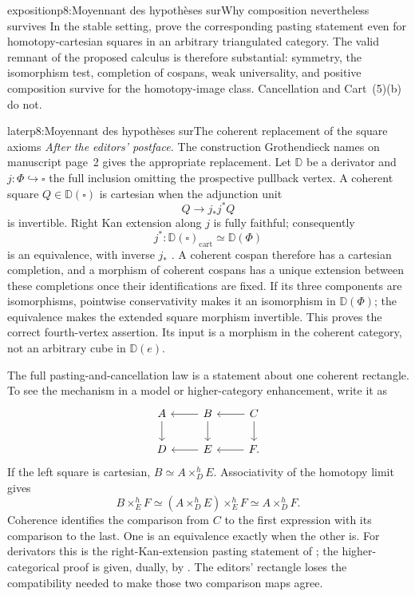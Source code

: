 \begin{dcomment}{exposition}{p8:Moyennant des hypothèses sur}{Why composition nevertheless survives}
In the stable setting, \citet[Proposition~6.11, pp.~17--18 of the 7~June~2021 author version]{ChristensenFrankland2022} prove the corresponding pasting statement even for homotopy-cartesian squares in an arbitrary triangulated category. The valid remnant of the proposed calculus is therefore substantial: symmetry, the isomorphism test, completion of cospans, weak universality, and positive composition survive for the homotopy-image class. Cancellation and Cart~(5)(b) do not.
\end{dcomment}


\begin{dcomment}{later}{p8:Moyennant des hypothèses sur}{The coherent replacement of the square axioms}
\emph{After the editors' postface.}
The construction Grothendieck names on manuscript page~2 gives the appropriate replacement. Let $\mathbb D$ be a derivator and $j:\Phi\hookrightarrow\square$ the full inclusion omitting the prospective pullback vertex. A coherent square $Q\in\mathbb D(\square)$ is cartesian when the adjunction unit
\[
 Q\longrightarrow j_*j^*Q
\]
is invertible. Right Kan extension along $j$ is fully faithful; consequently
\[
 j^*:\mathbb D(\square)_{\mathrm{cart}}
       \simeq\mathbb D(\Phi)
\]
is an equivalence, with inverse $j_*$ \citep[Proposition~1.20 and Definition~3.9]{Groth2013}. A coherent cospan therefore has a cartesian completion, and a morphism of coherent cospans has a unique extension between these completions once their identifications are fixed. If its three components are isomorphisms, pointwise conservativity makes it an isomorphism in $\mathbb D(\Phi)$; the equivalence makes the extended square morphism invertible. This proves the correct fourth-vertex assertion. Its input is a morphism in the coherent category, not an arbitrary cube in $\mathbb D(e)$.

The full pasting-and-cancellation law is a statement about one coherent rectangle. To see the mechanism in a model or higher-category enhancement, write it as
\[
\begin{tikzcd}
A\ar[d]&B\ar[l]\ar[d]&C\ar[l]\ar[d]\\
D&E\ar[l]&F\ar[l].
\end{tikzcd}
\]
If the left square is cartesian, $B\simeq A\times^h_D E$. Associativity of the homotopy limit gives
\[
 B\times^h_E F\simeq
 (A\times^h_D E)\times^h_E F\simeq A\times^h_D F.
\]
Coherence identifies the comparison from $C$ to the first expression with its comparison to the last. One is an equivalence exactly when the other is. For derivators this is the right-Kan-extension pasting statement of \citet[Proposition~3.13]{Groth2013}; the higher-categorical proof is given, dually, by \citet[Lemma~4.4.2.1]{Lurie2009HTT}. The editors' rectangle loses the compatibility needed to make those two comparison maps agree.


\end{dcomment}

